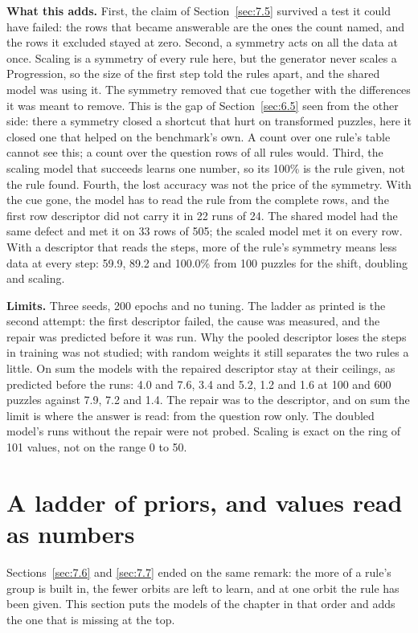 \textbf{What this adds.} First, the claim of Section~\ref{sec:7.5} survived a test it could have failed: the rows that became answerable are the ones the count named, and the rows it excluded stayed at zero. Second, a symmetry acts on all the data at once. Scaling is a symmetry of every rule here, but the generator never scales a Progression, so the size of the first step told the rules apart, and the shared model was using it. The symmetry removed that cue together with the differences it was meant to remove. This is the gap of Section~\ref{sec:6.5} seen from the other side: there a symmetry closed a shortcut that hurt on transformed puzzles, here it closed one that helped on the benchmark's own. A count over one rule's table cannot see this; a count over the question rows of all rules would. Third, the scaling model that succeeds learns one number, so its 100\% is the rule given, not the rule found. Fourth, the lost accuracy was not the price of the symmetry. With the cue gone, the model has to read the rule from the complete rows, and the first row descriptor did not carry it in 22 runs of 24. The shared model had the same defect and met it on 33 rows of 505; the scaled model met it on every row. With a descriptor that reads the steps, more of the rule's symmetry means less data at every step: 59.9, 89.2 and 100.0\% from 100 puzzles for the shift, doubling and scaling.

\textbf{Limits.} Three seeds, 200 epochs and no tuning. The ladder as printed is the second attempt: the first descriptor failed, the cause was measured, and the repair was predicted before it was run. Why the pooled descriptor loses the steps in training was not studied; with random weights it still separates the two rules a little. On sum the models with the repaired descriptor stay at their ceilings, as predicted before the runs: 4.0 and 7.6, 3.4 and 5.2, 1.2 and 1.6 at 100 and 600 puzzles against 7.9, 7.2 and 1.4. The repair was to the descriptor, and on sum the limit is where the answer is read: from the question row only. The doubled model's runs without the repair were not probed. Scaling is exact on the ring of 101 values, not on the range 0 to 50.

\section{A ladder of priors, and values read as numbers}\label{sec:7.8}

Sections~\ref{sec:7.6} and \ref{sec:7.7} ended on the same remark: the more of a rule's group is built in, the fewer orbits are left to learn, and at one orbit the rule has been given. This section puts the models of the chapter in that order and adds the one that is missing at the top.

